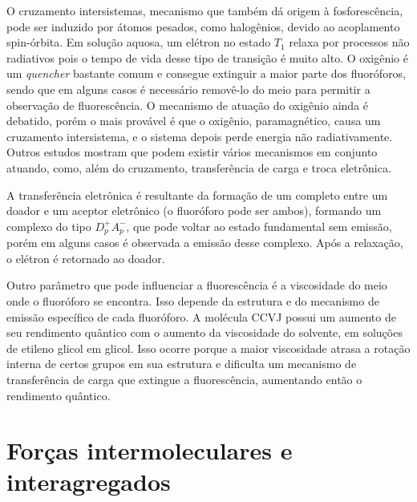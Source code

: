		O cruzamento intersistemas,  mecanismo que também dá origem à fosforescência, pode ser induzido por átomos pesados, como halogênios, devido ao acoplamento spin-órbita. Em solução aquosa, um elétron no estado \(T_1\) relaxa por processos não radiativos pois o tempo de vida desse tipo de transição é muito alto. O oxigênio é um \emph{quencher} bastante comum e consegue extinguir a maior parte dos fluoróforos, sendo que em alguns casos é necessário removê-lo do meio para permitir a observação de fluorescência. O mecanismo de atuação do oxigênio ainda é debatido, porém o mais provável é que o oxigênio, paramagnético, causa um cruzamento intersistema, e o sistema depois perde energia não radiativamente. Outros estudos mostram que podem existir vários mecanismos em conjunto atuando, como, além do cruzamento, transferência de carga e troca eletrônica. %
		
		A transferência eletrônica é resultante da formação de um completo entre um doador e um aceptor eletrônico (o fluoróforo pode ser ambos), formando um complexo do tipo \(D_p^+A_p^-\), que pode voltar ao estado fundamental sem emissão, porém em alguns casos é observada a emissão desse complexo. Após a relaxação, o elétron é retornado ao doador. 
		
		Outro parâmetro que pode influenciar a fluorescência é a viscosidade do meio onde o fluoróforo se encontra.  Isso depende da estrutura e do mecanismo de emissão específico de cada fluoróforo. A molécula CCVJ possui um aumento de seu rendimento quântico com o aumento da viscosidade do solvente, em soluções de etileno glicol em glicol. Isso ocorre porque a maior viscosidade atrasa a rotação interna de certos grupos em sua estrutura e dificulta um mecanismo de transferência de carga que extingue a fluorescência, aumentando então o rendimento quântico.
		
		
		
	\chapter{Forças intermoleculares e interagregados} 
	
